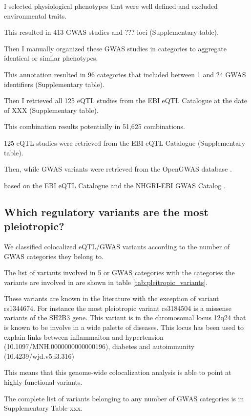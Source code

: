 I selected physiological phenotypes that were well defined and excluded environmental traits.

This resulted in 413 GWAS studies and ??? loci (Supplementary table).

Then I manually organized these GWAS studies in categories to aggregate identical or similar phenotypes.

This annotation resulted in 96 categories that included between 1 and 24 GWAS identifiers (Supplementary table).

Then I retrieved all 125 eQTL studies from the EBI eQTL Catalogue at the date of XXX (Supplementary table).

This combination results potentially in 51,625 combinations.

%
125 eQTL studies were retrieved from the EBI eQTL Catalogue (Supplementary table).

Then, while GWAS variants were retrieved from the OpenGWAS database \citep{2018.Parkinson.Buniello,2021.Alasoo.Kerimov}.

 based on the EBI eQTL Catalogue and the NHGRI-EBI GWAS Catalog \citep{2018.Parkinson.Buniello,2021.Alasoo.Kerimov}.


\subsection*{Which regulatory variants are the most pleiotropic?}

We classified colocalized eQTL/GWAS variants according to the number of GWAS categories they belong to.

The list of variants involved in 5 or GWAS categories with the categories the variants are involved in are shown in table \ref{tab:pleitropic_variants}.


These variants are known in the literature with the exception of variant rs1344674.
%
For instance the most pleiotropic variant rs3184504 is a missense variants of the SH2B3 gene.
This variant is in the chromosomal locus 12q24 that is known to be involve in a wide palette of diseases.
This locus has been used to explain links between inflammaiton and hypertension (10.1097/MNH.0000000000000196), diabetes and autoimmunity (10.4239/wjd.v5.i3.316)

%
This means that this genome-wide colocalization analysis is able to point at highly functional variants.

The complete list of variants belonging to any number of GWAS categories is in Supplementary Table xxx.

